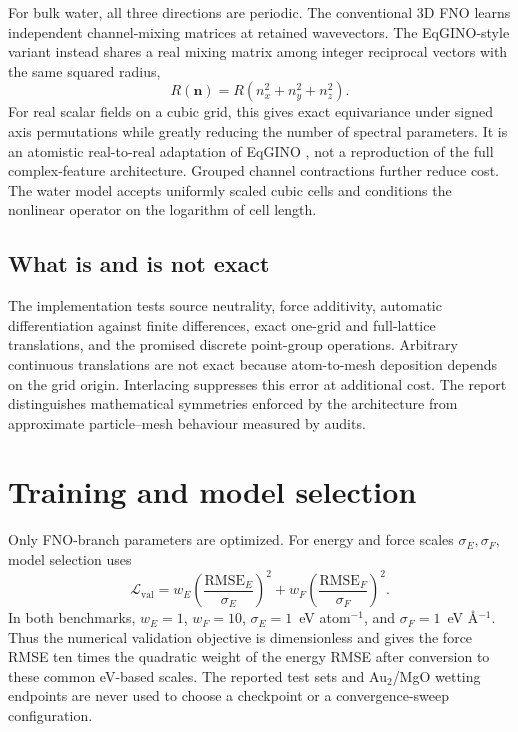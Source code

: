 \documentclass[11pt]{article}
\newcommand{\angstrom}{\ensuremath{\text{\AA}}}
\newcommand{\RMSE}{\ensuremath{\mathrm{RMSE}}}
\begin{document}
For bulk water, all three directions are periodic. The conventional 3D FNO
learns independent channel-mixing matrices at retained wavevectors. The
EqGINO-style variant instead shares a real mixing matrix among integer
reciprocal vectors with the same squared radius,
\begin{equation}
 R(\mathbf n)=R(n_x^2+n_y^2+n_z^2).
\end{equation}
For real scalar fields on a cubic grid, this gives exact equivariance under
signed axis permutations while greatly reducing the number of spectral
parameters. It is an atomistic real-to-real adaptation of EqGINO
\citep{kim2026eqgino}, not a reproduction of the full complex-feature
architecture. Grouped channel contractions further reduce cost. The water
model accepts uniformly scaled cubic cells and conditions the nonlinear
operator on the logarithm of cell length.

\subsection{What is and is not exact}

The implementation tests source neutrality, force additivity, automatic
differentiation against finite differences, exact one-grid and full-lattice
translations, and the promised discrete point-group operations. Arbitrary
continuous translations are not exact because atom-to-mesh deposition depends
on the grid origin. Interlacing suppresses this error at additional cost.
The report distinguishes mathematical symmetries enforced by the architecture
from approximate particle--mesh behaviour measured by audits.

\section{Training and model selection}

Only FNO-branch parameters are optimized. For energy and force scales
\(\sigma_E,\sigma_F\), model selection uses
\begin{equation}
 \mathcal L_{\mathrm{val}}=
 w_E\left(\frac{\RMSE_E}{\sigma_E}\right)^2+
 w_F\left(\frac{\RMSE_F}{\sigma_F}\right)^2 .
 \label{eq:validation-objective}
\end{equation}
In both benchmarks, \(w_E=1\), \(w_F=10\),
\(\sigma_E=1\)~eV atom\(^{-1}\), and
\(\sigma_F=1\)~eV \angstrom\(^{-1}\). Thus the numerical validation
objective is dimensionless and gives the force RMSE ten times the quadratic
weight of the energy RMSE after conversion to these common eV-based scales.
The reported test sets and Au$_2$/MgO wetting endpoints are never used to
choose a checkpoint or a convergence-sweep configuration.
\end{document}
